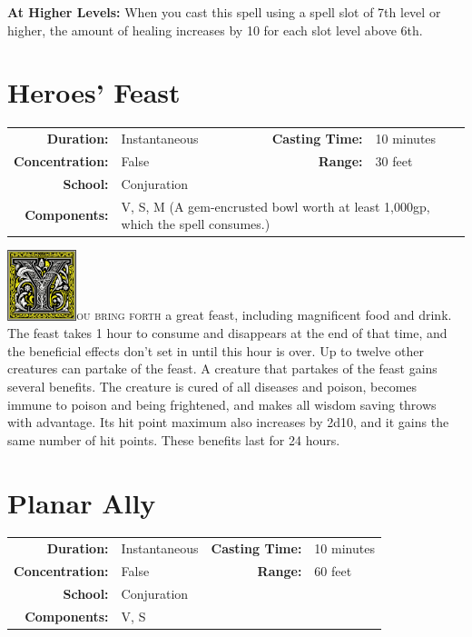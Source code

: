 \documentclass[12pt,showtrims]{memoir}
\begin{document}
\vspace{8pt} \noindent\textbf{At Higher Levels:} When you cast this spell using a spell slot of 7th level or higher, the amount of healing increases by 10 for each slot level above 6th.
\newpage
\section*{Heroes' Feast}

{
\small\centering\vspace{-6pt}
\begin{tabular}{rlrl}
\toprule

\textbf{Duration:} & Instantaneous &
\textbf{Casting Time:} & 10 minutes \\
\textbf{Concentration:} & False &
\textbf{Range:} & 30 feet \\
\textbf{School:} & Conjuration \\
\textbf{Components:} & \multicolumn{3}{p{0.7\textwidth}}{V, S, M (A gem-encrusted bowl worth at least 1,000gp, which the spell consumes.)}\\

\bottomrule
\end{tabular}
}

\vspace{1\baselineskip}\noindent
\lettrine[lines=4]{\includegraphics[height=58pt]{initials/Y.png}}{ou bring forth} a great feast, including magnificent food and drink. The feast takes 1 hour to consume and disappears at the end of that time, and the beneficial effects don't set in until this hour is over. Up to twelve other creatures can partake of the feast. A creature that partakes of the feast gains several benefits. The creature is cured of all diseases and poison, becomes immune to poison and being frightened, and makes all wisdom saving throws with advantage. Its hit point maximum also increases by 2d10, and it gains the same number of hit points. These benefits last for 24 hours.

\newpage
\section*{Planar Ally}

{
\small\centering\vspace{-6pt}
\begin{tabular}{rlrl}
\toprule

\textbf{Duration:} & Instantaneous &
\textbf{Casting Time:} & 10 minutes \\
\textbf{Concentration:} & False &
\textbf{Range:} & 60 feet \\
\textbf{School:} & Conjuration \\
\textbf{Components:} & \multicolumn{3}{p{0.7\textwidth}}{V, S}\\

\bottomrule
\end{tabular}
}
\end{document}

